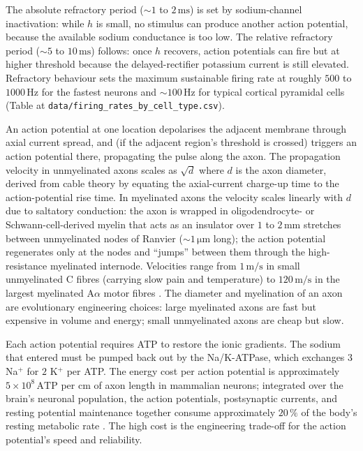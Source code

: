  The absolute refractory period
($\sim 1$ to $2\,\text{ms}$) is set by sodium-channel inactivation:
while $h$ is small, no stimulus can produce another action potential,
because the available sodium conductance is too low. The relative
refractory period ($\sim 5$ to $10\,\text{ms}$) follows: once $h$
recovers, action potentials can fire but at higher threshold because
the delayed-rectifier potassium current is still elevated. Refractory
behaviour sets the maximum sustainable firing rate at roughly
$500$ to $1000\,\text{Hz}$ for the fastest neurons and $\sim 100\,\text{Hz}$
for typical cortical pyramidal cells (Table at
\verb|data/firing_rates_by_cell_type.csv|).

 An action potential at one location depolarises
the adjacent membrane through axial current spread, and (if the
adjacent region's threshold is crossed) triggers an action potential
there, propagating the pulse along the axon. The propagation velocity
in unmyelinated axons scales as $\sqrt{d}$ where $d$ is the axon
diameter, derived from cable theory by equating the axial-current
charge-up time to the action-potential rise time. In myelinated axons
the velocity scales linearly with $d$ due to saltatory conduction:
the axon is wrapped in oligodendrocyte- or Schwann-cell-derived myelin
that acts as an insulator over $1$ to $2\,\text{mm}$ stretches between
unmyelinated nodes of Ranvier ($\sim 1\,\si{\micro\meter}$ long); the
action potential regenerates only at the nodes and ``jumps'' between
them through the high-resistance myelinated internode. Velocities
range from $1\,\text{m}/\text{s}$ in small unmyelinated C fibres
(carrying slow pain and temperature) to $120\,\text{m}/\text{s}$ in
the largest myelinated A$\alpha$ motor fibres
\cite[ch.~6]{text:v6c07-kandel-principles-2021}. The diameter and
myelination of an axon are evolutionary engineering choices: large
myelinated axons are fast but expensive in volume and energy; small
unmyelinated axons are cheap but slow.

 Each action potential requires ATP to
restore the ionic gradients. The sodium that entered must be pumped
back out by the Na/K-ATPase, which exchanges $3$ Na$^+$ for $2$ K$^+$
per ATP. The energy cost per action potential is approximately
$5 \times 10^8\,\text{ATP}$ per cm of axon length in mammalian
neurons; integrated over the brain's neuronal population, the action
potentials, postsynaptic currents, and resting potential maintenance
together consume approximately $20\,\%$ of the body's resting
metabolic rate \cite{paper:v6c07-attwell-laughlin-2001}. The high
cost is the engineering trade-off for the action potential's speed
and reliability.


